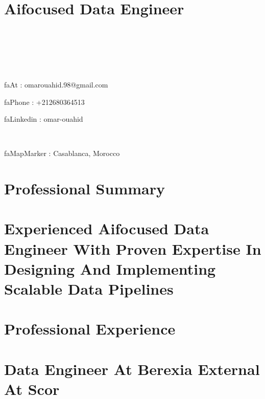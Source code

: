 \documentclass[11pt,a4paper,sans]{resume}
\begin{document}
\makeheader



\section{Aifocused Data Engineer}
\item \
\item \
\item \
\item faAt : omarouahid.98@gmail.com
\item faPhone : +212680364513
\item faLinkedin : omar-ouahid
\item \
\item faMapMarker  : Casablanca, Morocco

\section{Professional Summary}


\section{Experienced Aifocused Data Engineer With Proven Expertise In Designing And Implementing Scalable Data Pipelines}


\section{Professional Experience}


\section{Data Engineer At Berexia External At Scor}
\end{document}
